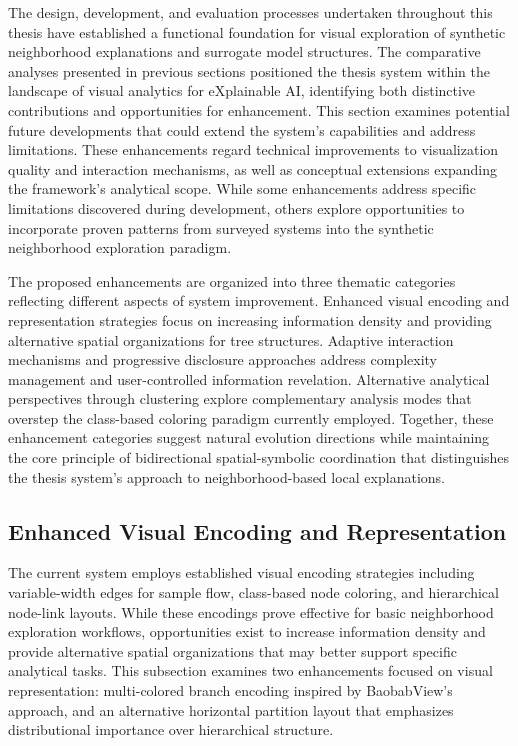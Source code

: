 

The design, development, and evaluation processes undertaken throughout this thesis have established a functional foundation for visual exploration of synthetic neighborhood explanations and surrogate model structures. The comparative analyses presented in previous sections positioned the thesis system within the landscape of visual analytics for eXplainable AI, identifying both distinctive contributions and opportunities for enhancement. This section examines potential future developments that could extend the system's capabilities and address limitations. These enhancements regard technical improvements to visualization quality and interaction mechanisms, as well as conceptual extensions expanding the framework's analytical scope. While some enhancements address specific limitations discovered during development, others explore opportunities to incorporate proven patterns from surveyed systems into the synthetic neighborhood exploration paradigm.

The proposed enhancements are organized into three thematic categories reflecting different aspects of system improvement. Enhanced visual encoding and representation strategies focus on increasing information density and providing alternative spatial organizations for tree structures. Adaptive interaction mechanisms and progressive disclosure approaches address complexity management and user-controlled information revelation. Alternative analytical perspectives through clustering explore complementary analysis modes that overstep the class-based coloring paradigm currently employed. Together, these enhancement categories suggest natural evolution directions while maintaining the core principle of bidirectional spatial-symbolic coordination that distinguishes the thesis system's approach to neighborhood-based local explanations.

\subsection{Enhanced Visual Encoding and Representation}

The current system employs established visual encoding strategies including variable-width edges for sample flow, class-based node coloring, and hierarchical node-link layouts. While these encodings prove effective for basic neighborhood exploration workflows, opportunities exist to increase information density and provide alternative spatial organizations that may better support specific analytical tasks. This subsection examines two enhancements focused on visual representation: multi-colored branch encoding inspired by BaobabView's approach, and an alternative horizontal partition layout that emphasizes distributional importance over hierarchical structure.

